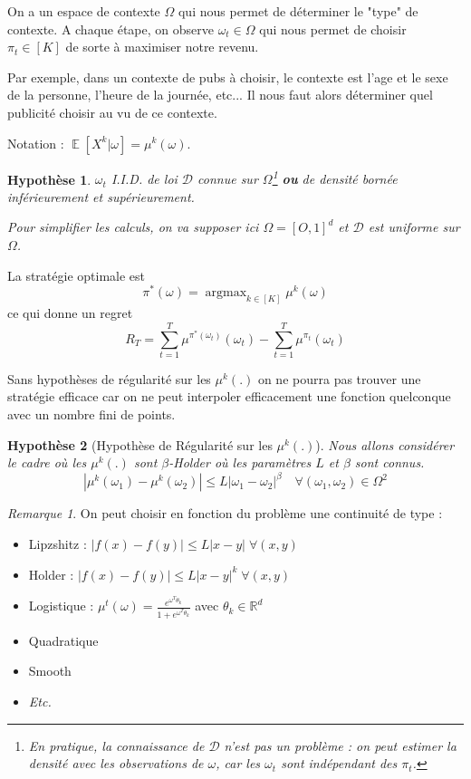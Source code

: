 \documentclass{article}
\DeclareMathOperator*{\argmax}{argmax}
\DeclareMathOperator*{\E}{\mathbb{E}}
\newtheorem{hypothesis}{Hypothèse}[section]
\theoremstyle{remark}
\theoremstyle{remark}
\newtheorem{remark}{Remarque}[section]
\begin{document}
On a un espace de contexte $\Omega$ qui nous permet de déterminer le "type" de contexte. A chaque étape, on observe $\omega_t \in \Omega$ qui nous permet de choisir $\pi_t \in [K]$ de sorte à maximiser notre revenu.

Par exemple, dans un contexte de pubs à choisir, le contexte est l'age et le sexe de la personne, l'heure de la journée, etc... Il nous faut alors déterminer quel publicité choisir au vu de ce contexte.

Notation : $\E[X^k | \omega] = \mu^k(\omega)$.

\begin{hypothesis}
   $\omega_t$ I.I.D. de loi $\mathcal{D}$ connue sur $\Omega$\footnote{En pratique, la connaissance de $\mathcal{D}$ n'est pas un problème : on peut estimer la densité avec les observations de $\omega$, car les $\omega_t$ sont indépendant des $\pi_t$.} \textbf{ou} de densité bornée inférieurement et supérieurement.

   Pour simplifier les calculs, on va supposer ici $\Omega = [O,1]^d$ et $\mathcal{D}$ est uniforme sur $\Omega$.
\end{hypothesis}

La stratégie optimale est
$$
\pi^*(\omega) = \argmax_{k \in [K]} \mu^k(\omega)
$$
ce qui donne un regret
$$
R_T = \sum_{t=1}^T \mu^{\pi^*(\omega_t)}(\omega_t) - \sum_{t=1}^T \mu^{\pi_t}(\omega_t)
$$

Sans hypothèses de régularité sur les $\mu^k(.)$ on ne pourra pas trouver une stratégie efficace car on ne peut interpoler efficacement une fonction quelconque avec un nombre fini de points.

\begin{hypothesis}[Hypothèse de Régularité sur les $\mu^k(.)$]
   Nous allons considérer le cadre où les $\mu^k(.)$ sont $\beta$-Holder où les paramètres $L$ et $\beta$ sont connus.
   $$
   |\mu^k(\omega_1) - \mu^k(\omega_2)| \leq L |\omega_1 - \omega_2|^\beta \quad \forall (\omega_1,\omega_2) \in \Omega^2
   $$
\end{hypothesis}

\begin{remark}
   On peut choisir en fonction du problème une continuité de type :
   \begin{itemize}
      \item Lipzshitz : $|f(x) - f(y)| \leq L |x - y| \; \forall (x,y)$
      \item Holder : $|f(x) - f(y)| \leq L |x - y|^k \; \forall (x,y)$
      \item Logistique : $\mu^t(\omega) = \frac{e^{\omega^T \theta_k}}{1+e^{\omega^T \theta_k}}$ avec $\theta_k \in \mathbb{R}^d$
      \item Quadratique
      \item Smooth
      \item \textit{Etc.}
   \end{itemize}
\end{remark}
\end{document}
